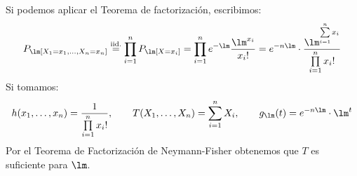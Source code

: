 \begin{ejercicio}
\begin{enumerate}
        Si podemos aplicar el Teorema de factorización, escribimos:
        \begin{equation*}
            P_\lm[X_1=x_1, \ldots, X_n = x_n] \stackrel{\text{iid.}}{=} \prod_{i=1}^{n} P_\lm[X=x_i] = \prod_{i=1}^{n}e^{-\lm}\dfrac{\lm^{x_i}}{x_i!} = e^{-n\lm} \cdot \dfrac{\lm^{\sum\limits_{i=1}^{n} x_i}}{\prod\limits_{i=1}^{n}x_i!}
        \end{equation*}
        Si tomamos:
        \begin{equation*}
            h(x_1, \ldots, x_n) = \dfrac{1}{\prod\limits_{i=1}^{n}x_i!}, \qquad T(X_1, \ldots, X_n) = \sum_{i=1}^{n}X_i, \qquad g_\lm(t) = e^{-n\lm} \cdot \lm^t
        \end{equation*}
        Por el Teorema de Factorización de Neymann-Fisher obtenemos que $T$ es suficiente para $\lm$.

    \end{enumerate}
\end{ejercicio}

